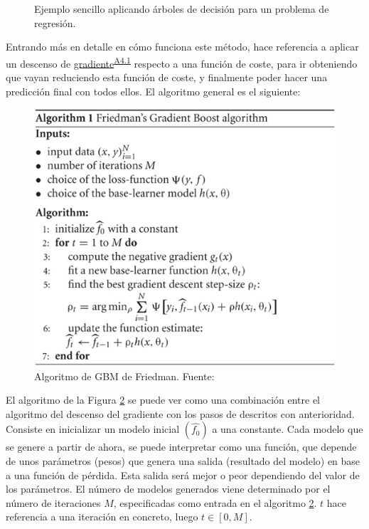 {\begin{figure}[H]
    \caption{Ejemplo sencillo aplicando árboles de decisión para un problema de regresión.}
    \label{dec_trees}
\end{figure}

Entrando más en detalle en cómo funciona este método,  hace referencia a aplicar un descenso de \ul{gradiente}\textsuperscript{\hyperref[ap:desc_grad]{A4.1}} respecto a una función de coste, para ir obteniendo  que vayan reduciendo esta función de coste, y finalmente poder hacer una predicción final con todos ellos. El algoritmo general es el siguiente:

\begin{figure}[H]
    \centering
    \includegraphics[scale = 0.5]{imgs/GBM_algm.png}
    \caption{Algoritmo de GBM de Friedman. \scriptsize{Fuente: \parencite{GBMtutorial}}}
    \label{GBM_algm}
\end{figure}

El algoritmo de la Figura \ref{GBM_algm} se puede ver como una combinación entre el algoritmo del descenso del gradiente con  los pasos de  descritos con anterioridad. Consiste en inicializar un modelo inicial $(\widehat{f_0})$ a una constante. Cada modelo que se genere a partir de ahora, se puede interpretar como una función, que depende de unos parámetros (pesos) que genera una salida (resultado del modelo) en base a una función de pérdida\fnm. Esta salida será mejor o peor dependiendo del valor de los parámetros. El número de modelos generados viene determinado por el número de iteraciones $M$, especificadas como entrada en el algoritmo \ref{GBM_algm}. $t$ hace referencia a una iteración en concreto, luego  $t \in [0, M]$.

}
